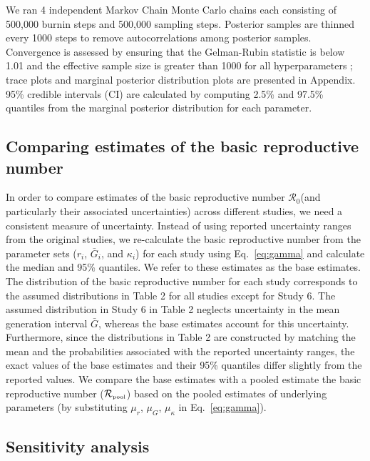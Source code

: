 \documentclass[12pt]{article}
\newcommand{\eref}[1]{Eq.~\ref{eq:#1}}
\newcommand{\Ro}{\ensuremath{{\mathcal R}_{0}}\xspace}
\newcommand{\Rpool}{\ensuremath{{\mathcal R}_{\textrm{\tiny{pool}}}}\xspace}
\begin{document}
We ran 4 independent Markov Chain Monte Carlo chains each consisting of 500,000 burnin steps and 500,000 sampling steps.
Posterior samples are thinned every 1000 steps to remove autocorrelations among posterior samples.
Convergence is assessed by ensuring that the Gelman-Rubin statistic is below 1.01 and the effective sample size is greater than 1000 for all hyperparameters \citep{gelman1992inference};
trace plots and marginal posterior distribution plots are presented in Appendix.
95\% credible intervals (CI) are calculated by computing 2.5\% and 97.5\% quantiles from the marginal posterior distribution for each parameter.

\subsection{Comparing estimates of the basic reproductive number}

In order to compare estimates of the basic reproductive number \Ro (and particularly their associated uncertainties) across different studies, we need a consistent measure of uncertainty.
Instead of using reported uncertainty ranges from the original studies, we re-calculate the basic reproductive number from the parameter sets ($r_i$, $\bar G_i$, and $\kappa_i$) for each study using \eref{gamma} and calculate the median and 95\% quantiles.
We refer to these estimates as the base estimates.
The distribution of the basic reproductive number for each study corresponds to the assumed distributions in Table 2 for all studies except for Study 6.
The assumed distribution in Study 6 in Table 2 neglects uncertainty in the mean generation interval $\bar G$, whereas the base estimates account for this uncertainty.
Furthermore, since the distributions in Table 2 are constructed by matching the mean and the probabilities associated with the reported uncertainty ranges, the exact values of the base estimates and their 95\% quantiles differ slightly from the reported values.
We compare the base estimates with a pooled estimate the basic reproductive number (\Rpool) based on the pooled estimates of underlying parameters (by substituting $\mu_r$, $\mu_G$, $\mu_\kappa$ in \eref{gamma}). 

\subsection{Sensitivity analysis}
\end{document}
